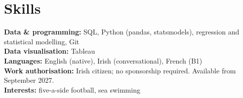 \documentclass[11pt,a4paper]{article}
\begin{document}
\section{Skills}
\textbf{Data \& programming:} SQL, Python (pandas, statsmodels), regression and statistical modelling, Git \\
\textbf{Data visualisation:} Tableau \\
\textbf{Languages:} English (native), Irish (conversational), French (B1) \\
\textbf{Work authorisation:} Irish citizen; no sponsorship required. Available from September 2027. \\
\textbf{Interests:} five-a-side football, sea swimming
\end{document}
